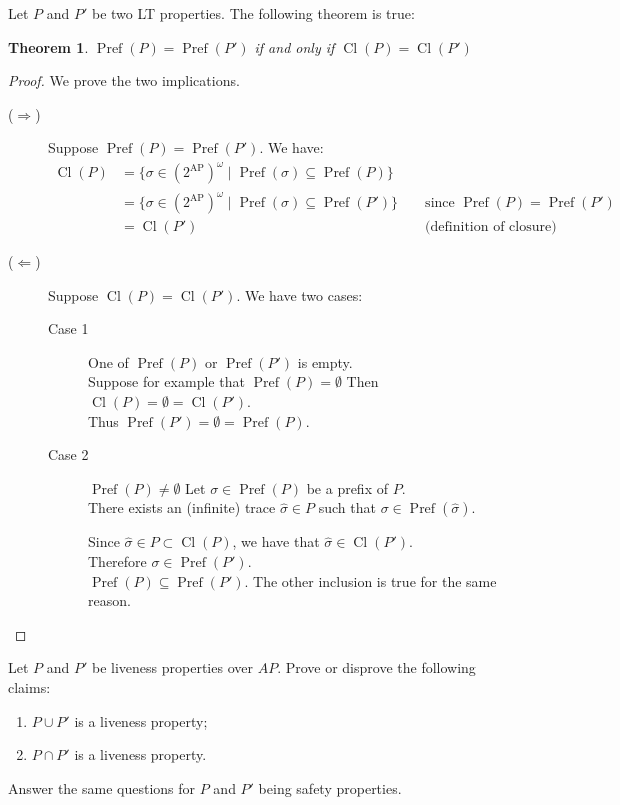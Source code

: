 \documentclass[11pt,a4paper]{article}
\newtheorem*{theorem}{Theorem}
\DeclareMathOperator{\Pref}{Pref}
\DeclareMathOperator{\Cl}{Cl}
\begin{document}
\begin{Answer}

  Let $P$ and $P'$ be two LT properties. The following theorem is true:
  \begin{theorem}
    $\Pref(P) = \Pref(P')$ if and only if $\Cl(P) = \Cl(P')$
  \end{theorem}
  \begin{proof}
    We prove the two implications.
    \begin{description}
      \item[($\Rightarrow$)]
        Suppose $\Pref(P) = \Pref(P')$. We have:
        \begin{align*}
          \Cl(P) &= \{\sigma\in{(2^{\textrm{AP}})}^\omega \mid \Pref(\sigma)\subseteq\Pref(P)\}\\
          &= \{\sigma\in{(2^{\textrm{AP}})}^\omega \mid \Pref(\sigma)\subseteq\Pref(P')\} &&\text{ since }\Pref(P) = \Pref(P')\\
          &= \Cl(P')&&\text{ (definition of closure)}
        \end{align*}
      \item[($\Leftarrow$)]
        Suppose $\Cl(P) = \Cl(P')$. We have two cases:
        \begin{description}
          \item[Case 1] One of $\Pref(P)$ or $\Pref(P')$ is empty.\\
          Suppose for example that $\Pref(P) = \emptyset$ Then $\Cl(P) = \emptyset = \Cl(P')$.\\
          Thus $\Pref(P') = \emptyset = \Pref(P)$.
          \item[Case 2] $\Pref(P) \neq \emptyset$
          Let $\sigma\in\Pref(P)$ be a prefix of $P$. \\
          There exists an (infinite) trace $\hat{\sigma} \in P$ such that $\sigma\in\Pref(\hat{\sigma})$.

          Since $\hat{\sigma}\in P\subset\Cl(P)$, we have that $\hat{\sigma}\in\Cl(P')$. \\
          Therefore $\sigma\in\Pref(P')$.\\
          $\Pref(P)\subseteq\Pref(P')$. The other inclusion is true for the same reason.

        \end{description}
    \end{description}
  \end{proof}
\end{Answer}

\begin{Exercise}
Let $P$ and $P'$ be liveness properties over $AP$. Prove or disprove the following claims:
\begin{enumerate}
\item $P \cup P'$ is a liveness property;
\item $P \cap P'$ is a liveness property.
\end{enumerate}
Answer the same questions for $P$ and $P'$ being safety properties.
\end{Exercise}
\end{document}
